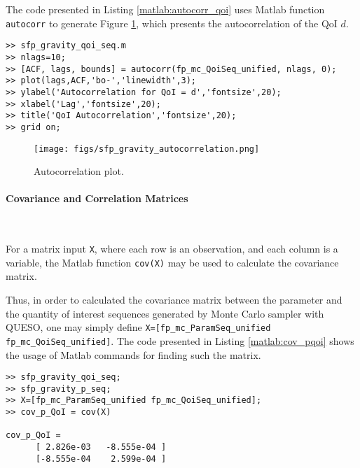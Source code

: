 The code presented in Listing \ref{matlab:autocorr_qoi} uses Matlab function \verb+autocorr+ to generate Figure \ref{fig:sfp_gravity_autocorrelation},
which presents the autocorrelation of the QoI $d$.

\begin{lstlisting}[label=matlab:autocorr_qoi,caption={Matlab code for the QoI autocorrelation plot.}]
% inside Matlab
>> sfp_gravity_qoi_seq.m
>> nlags=10;
>> [ACF, lags, bounds] = autocorr(fp_mc_QoiSeq_unified, nlags, 0);
>> plot(lags,ACF,'bo-','linewidth',3);
>> ylabel('Autocorrelation for QoI = d','fontsize',20);
>> xlabel('Lag','fontsize',20);
>> title('QoI Autocorrelation','fontsize',20);
>> grid on;
\end{lstlisting}

\begin{figure}[p]
\centering
\texttt{[image: figs/sfp\_gravity\_autocorrelation.png]}
\vspace*{-10pt}
\caption{Autocorrelation plot.}
\label{fig:sfp_gravity_autocorrelation}
\end{figure}

\paragraph{Covariance and Correlation Matrices} \

For a matrix input \verb+X+, where each row is an observation, and each column is a variable, the Matlab function \verb+cov(X)+ may be used to calculate the covariance matrix.

Thus,  in order to calculated the covariance matrix between the parameter and the quantity of interest sequences generated by Monte Carlo sampler with QUESO,
one may simply define \verb+X=[fp_mc_ParamSeq_unified fp_mc_QoiSeq_unified]+.
The code presented in Listing \ref{matlab:cov_pqoi} shows the usage of Matlab commands for finding such the matrix.

\begin{lstlisting}[label=matlab:cov_pqoi,caption={Matlab code for the matrix of covariance between parameter $g$ and QoI $d$.}]
% inside Matlab
>> sfp_gravity_qoi_seq;
>> sfp_gravity_p_seq;
>> X=[fp_mc_ParamSeq_unified fp_mc_QoiSeq_unified];
>> cov_p_QoI = cov(X)

cov_p_QoI =
	  [ 2.826e-03 	-8.555e-04 ] 
	  [-8.555e-04 	 2.599e-04 ]

\end{lstlisting}

